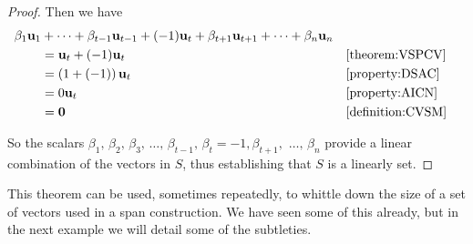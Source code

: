 \documentclass{ximera}
\begin{document}
\begin{theorem}
\begin{proof}
    Then we have
    \begin{align*}
      \beta_1\mathbf{u}_1
      &+\cdots+
        \beta_{t-1}\mathbf{u}_{t-1}+
        (-1)\mathbf{u}_t+
        \beta_{t+1}\mathbf{u}_{t+1}+
        \cdots+
        \beta_n\mathbf{u}_n\\
      &=\mathbf{u}_t+(-1)\mathbf{u}_t&&\ref{theorem:VSPCV}\\
      &=\left(1+\left(-1\right)\right)\mathbf{u}_t&&\ref{property:DSAC}\\
      &=0\mathbf{u}_t&&\ref{property:AICN}\\
      &=\mathbf{0}&&\ref{definition:CVSM}
    \end{align*}
    
    So the scalars
    $\beta_1,\,\beta_2,\,\beta_3,\,\ldots,\,\beta_{t-1},\,\beta_t=-1,\beta_{t+1},\,\,\ldots,\,\beta_n$
    provide a
     linear
    combination of the vectors in $S$, thus establishing that $S$ is a
    linearly  set.
    
  \end{proof}
\end{theorem}

This theorem can be used, sometimes repeatedly, to whittle down the
size of a set of vectors used in a span construction.  We have seen
some of this already, but in the next example we will detail some of
the subtleties.
\end{document}
